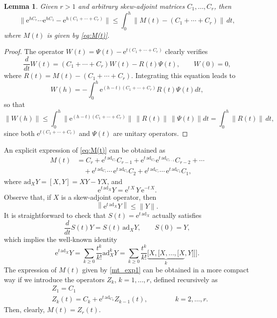 \documentclass[11pt]{article}
\newcommand{\e}{\ensuremath{\mathrm{e}}}
\newcommand{\ad}{\ensuremath{\mathrm{ad}}}
\newtheorem{lemma}{Lemma}[section]
\begin{document}
\begin{lemma} \label{lemma_estimate}
Given $r>1$ and arbitrary skew-adjoint matrices $C_1,\ldots,C_r$, then
\[
\|\e^{h C_r}\cdots \e^{h C_1} - \e^{h (C_1+ \cdots + C_r)}\| \leq 
\int_0^h \| M(t) - (C_1+\cdots+C_r)\| \, dt,
\]
where $M(t)$ is given by \eqref{eq:M(t)}.
\end{lemma}  

\begin{proof}
The operator $W(t)=\Psi(t) - \e^{t (C_1+ \cdots + C_r)}$ clearly verifies
\[
  \frac{d }{dt} W(t) = (C_1 + \cdots + C_r) W(t) - R(t) \Psi(t), \qquad W(0) = 0,
\]
where $R(t) = M(t) - (C_1+\cdots + C_r)$. Integrating this equation leads to
\[
  W(h) = - \int_0^h \e^{(h - t)(C_1 + \cdots + C_r)} R(t) \Psi(t) dt,  
\]
so that
\[
  \|W(h)\| \leq \int_0^h \|\e^{(h - t)(C_1 + \cdots + C_r)} \| \, \|R(t)\| \, \|\Psi(t)\| dt = \int_0^h  \|R(t)\|  \, dt, 
\]
since both $\e^{t (C_1+ \cdots + C_r)}$ and $\Psi(t)$ are unitary operators.
\end{proof}  
An explicit expression of \eqref{eq:M(t)} can be obtained  as 
\begin{equation} \label{mt_exp1}
\begin{aligned}
  M(t) & = C_r + \e^{t \, \ad_{C_r}} C_{r-1} +  \e^{t \, \ad_{C_r}} \e^{t \, \ad_{C_{r-1}}} C_{r-2} + \cdots \\
    & \quad + \e^{t \, \ad_{C_r}} \cdots \, \e^{t \, \ad_{C_3}} C_2 + \e^{t \, \ad_{C_r}} \cdots \, \e^{t \, \ad_{C_2}} C_1,
\end{aligned}
\end{equation}    
where $\ad_X Y = [X,Y] = X Y  - Y X$, and
\[
  \e^{t \, \ad_{X}} Y = \e^{t \,  X} \, Y \, \e^{-t \,  X}.
  \]
 Observe that, if $X$ is a skew-adjoint operator, then
 \[
 \left\| 
  \e^{t \, \ad_{X}} Y
  \right\| 
  \leq \|Y\|.
 \]
It is straightforward to check that $S(t) = \e^{t \, \ad_{X}}$ actually satisfies 
\begin{equation*}
\frac{d}{dt} S(t) Y = S(t) \, \ad_{X} Y, \qquad S(0) = Y, 
\end{equation*}
which implies the well-known identity
\begin{equation}
\label{eq:exp_ad_infty}
\e^{t \, \ad_{X}} Y = \sum_{k \ge 0} \frac{t^k }{k!} \ad_X^k Y = \sum_{k \ge 0} \frac{t^k }{k!}
 \underbrace{[X, [X, \ldots, [X}_{k}, Y]]].
\end{equation}
%
 The expression of $M(t)$ given by \eqref{mt_exp1} can be obtained in a more compact way if we introduce 
the operators $Z_{k}$, $k=1,\ldots, r$, defined recursively as
\begin{equation} \label{zetas}
\begin{aligned}
  & Z_1  = C_1 \\
  & Z_k(t)  = C_k + \e^{t \, \ad_{C_k}}  Z_{k-1}(t), \qquad\qquad k=2,\ldots, r.
  \end{aligned}
\end{equation}
Then, clearly, $M(t) = Z_{r}(t)$. 
\end{document}
